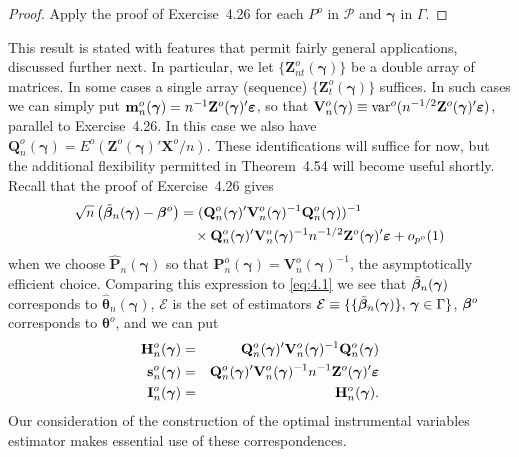 \begin{proof}
Apply the proof of Exercise~4.26 for each $P^o$ in $\mathcal{P}$ and $\boldsymbol{\gamma}$ in $\Gamma$.
\end{proof}

This result is stated with features that permit fairly general applications,
discussed further next. In particular, we let $\{\mathbf{Z}_{nt}^o(\boldsymbol{\gamma})\}$ be a double array
of matrices. In some cases a single array (sequence) $\{\mathbf{Z}_t^o(\boldsymbol{\gamma})\}$ suffices. In
such cases we can simply put $\mathbf{m}_n^o(\boldsymbol{\gamma}) = n^{-1}\mathbf{Z}^o(\boldsymbol{\gamma})'\boldsymbol{\varepsilon}$, so that $\mathbf{V}_n^o(\boldsymbol{\gamma}) \equiv
\mathrm{var}^o(n^{-1/2}\mathbf{Z}^o(\boldsymbol{\gamma})'\boldsymbol{\varepsilon})$, parallel to Exercise~4.26. In this case we also have
$\mathbf{Q}_n^o(\boldsymbol{\gamma}) = E^o(\mathbf{Z}^o(\boldsymbol{\gamma})'\mathbf{X}^o/n)$. These identifications will suffice for now, but
the additional flexibility permitted in Theorem~4.54 will become useful
shortly. Recall that the proof of Exercise~4.26 gives
\begin{align*}
\sqrt{n}\left(\tilde{\boldsymbol{\beta}}_n(\boldsymbol{\gamma}) - \boldsymbol{\beta}^o\right) &= (\mathbf{Q}_n^o(\boldsymbol{\gamma})'\mathbf{V}_n^o(\boldsymbol{\gamma})^{-1}\mathbf{Q}_n^o(\boldsymbol{\gamma}))^{-1} \\
&\quad\times \mathbf{Q}_n^o(\boldsymbol{\gamma})'\mathbf{V}_n^o(\boldsymbol{\gamma})^{-1}n^{-1/2}\mathbf{Z}^o(\boldsymbol{\gamma})'\boldsymbol{\varepsilon} + o_{p^o}(1)
\end{align*}
when we choose $\hat{\mathbf{P}}_n(\boldsymbol{\gamma})$ so that $\mathbf{P}_n^o(\boldsymbol{\gamma}) = \mathbf{V}_n^o(\boldsymbol{\gamma})^{-1}$, the asymptotically efficient choice. Comparing this expression to \eqref{eq:4.1} we see that $\tilde{\boldsymbol{\beta}}_n(\boldsymbol{\gamma})$ corresponds to $\hat{\boldsymbol{\theta}}_n(\boldsymbol{\gamma})$, $\mathcal{E}$ is the set of estimators $\mathcal{E} \equiv \{\{\tilde{\boldsymbol{\beta}}_n(\boldsymbol{\gamma})\},\, \boldsymbol{\gamma} \in \Gamma\}$, $\boldsymbol{\beta}^o$
corresponds to $\boldsymbol{\theta}^o$, and we can put
\begin{eqnarray*}
\mathbf{H}_n^o(\boldsymbol{\gamma}) &=& \mathbf{Q}_n^o(\boldsymbol{\gamma})'\mathbf{V}_n^o(\boldsymbol{\gamma})^{-1}\mathbf{Q}_n^o(\boldsymbol{\gamma})\\
\mathbf{s}_n^o(\boldsymbol{\gamma}) &=& \mathbf{Q}_n^o(\boldsymbol{\gamma})'\mathbf{V}_n^o(\boldsymbol{\gamma})^{-1}n^{-1}\mathbf{Z}^o(\boldsymbol{\gamma})'\boldsymbol{\varepsilon}\\
\mathbf{I}_n^o(\boldsymbol{\gamma}) &=& \mathbf{H}_n^o(\boldsymbol{\gamma}).
\end{eqnarray*}
Our consideration of the construction of the optimal instrumental variables
estimator makes essential use of these correspondences.

